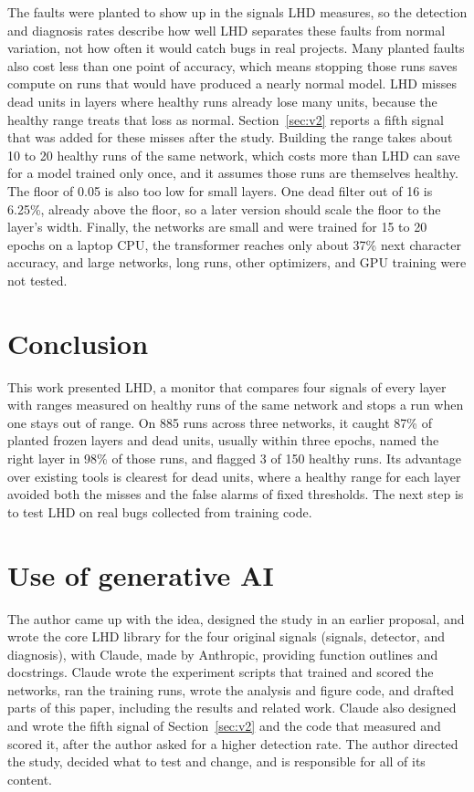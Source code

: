 \documentclass[11pt]{article}
\begin{document}
The faults were planted to show up in the signals LHD measures, so the detection and diagnosis rates describe how well LHD separates these faults from normal variation, not how often it would catch bugs in real projects. Many planted faults also cost less than one point of accuracy, which means stopping those runs saves compute on runs that would have produced a nearly normal model. LHD misses dead units in layers where healthy runs already lose many units, because the healthy range treats that loss as normal. Section~\ref{sec:v2} reports a fifth signal that was added for these misses after the study. Building the range takes about 10 to 20 healthy runs of the same network, which costs more than LHD can save for a model trained only once, and it assumes those runs are themselves healthy. The floor of 0.05 is also too low for small layers. One dead filter out of 16 is 6.25\%, already above the floor, so a later version should scale the floor to the layer's width. Finally, the networks are small and were trained for 15 to 20 epochs on a laptop CPU, the transformer reaches only about 37\% next character accuracy, and large networks, long runs, other optimizers, and GPU training were not tested.

\section{Conclusion}

This work presented LHD, a monitor that compares four signals of every layer with ranges measured on healthy runs of the same network and stops a run when one stays out of range. On 885 runs across three networks, it caught 87\% of planted frozen layers and dead units, usually within three epochs, named the right layer in 98\% of those runs, and flagged 3 of 150 healthy runs. Its advantage over existing tools is clearest for dead units, where a healthy range for each layer avoided both the misses and the false alarms of fixed thresholds. The next step is to test LHD on real bugs collected from training code.

\section*{Use of generative AI}

The author came up with the idea, designed the study in an earlier proposal, and wrote the core LHD library for the four original signals (signals, detector, and diagnosis), with Claude, made by Anthropic, providing function outlines and docstrings. Claude wrote the experiment scripts that trained and scored the networks, ran the training runs, wrote the analysis and figure code, and drafted parts of this paper, including the results and related work. Claude also designed and wrote the fifth signal of Section~\ref{sec:v2} and the code that measured and scored it, after the author asked for a higher detection rate. The author directed the study, decided what to test and change, and is responsible for all of its content.
\end{document}
